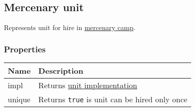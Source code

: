 \subsection{Mercenary unit}
\label{MercenaryUnit}
Represents unit for hire in \hyperref[Mercenary]{mercenary camp}.
\subsubsection{Properties}
\begin{center}
\begin{tabularx}{\linewidth}{| l | X |}
\hline
\textbf{Name} & \textbf{Description} \\
\hline
impl & Returns \hyperref[UnitImpl]{unit implementation}\\
\hline
unique & Returns \texttt{true} is unit can be hired only once\\
\hline
\end{tabularx}
\end{center}
